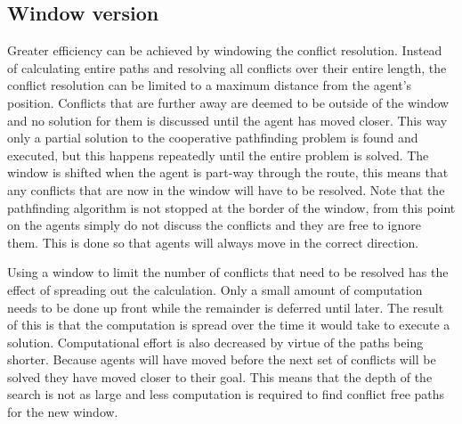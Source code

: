 \documentclass[a4paper]{article}
\begin{document}
\subsection{Window version}
Greater efficiency can be achieved by windowing the conflict resolution.
Instead of calculating entire paths and resolving all conflicts over their
entire length, the conflict resolution can be limited to a maximum distance
from the agent's position. Conflicts that are further away are deemed to be
outside of the window and no solution for them is discussed until the agent has
moved closer. This way only a partial solution to the cooperative pathfinding
problem is found and executed, but this happens repeatedly until the entire
problem is solved. The window is shifted when the agent is part-way through the
route, this means that any conflicts that are now in the window will have to be
resolved. Note that the pathfinding algorithm is not stopped at the border of
the window, from this point on the agents simply do not discuss the conflicts
and they are free to ignore them. This is done so that agents will always move
in the correct direction.

Using a window to limit the number of conflicts that need to be resolved has
the effect of spreading out the calculation. Only a small amount of computation
needs to be done up front while the remainder is deferred until later. The
result of this is that the computation is spread over the time it would take to
execute a solution. Computational effort is also decreased by virtue of the paths being shorter. Because agents will have moved before the next set of conflicts will be solved they have moved closer to their goal. This means that the depth of the search is not as large and less computation is required to find conflict free paths for the new window.



\end{document}
